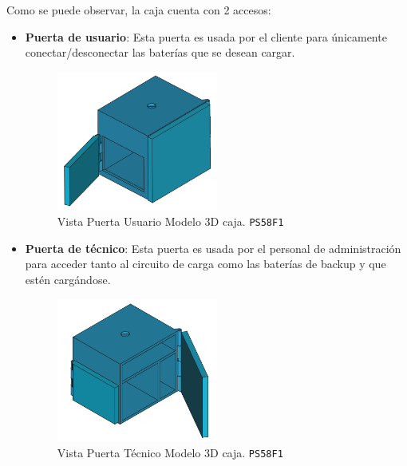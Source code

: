 Como se puede observar, la caja cuenta con 2 accesos:
\begin{itemize}
    \item \textbf{Puerta de usuario}: Esta puerta es usada por el cliente para únicamente conectar/desconectar las baterías que se desean cargar.

\begin{figure}[H]
    \centering
    \includegraphics[width=0.5\textwidth]{images/4-DesarrolloTeorico/4-1-caja/CAJA_3D_PUERTA_USER.png}
    \caption{Vista Puerta Usuario Modelo 3D caja. \texttt{PS58F1}}
    \label{fig:DesarrolloTeorico/Caja/CAJA_3D_PUERTA_USER}
\end{figure}

    \item \textbf{Puerta de técnico}: Esta puerta es usada por el personal de administración para acceder tanto al circuito de carga como las baterías de backup y que estén cargándose.
\begin{figure}[H]
    \centering
    \includegraphics[width=0.5\textwidth]{images/4-DesarrolloTeorico/4-1-caja/CAJA_3D_PUERTA_ADMIN.png}
    \caption{Vista Puerta Técnico Modelo 3D caja. \texttt{PS58F1}}
    \label{fig:DesarrolloTeorico/Caja/CAJA_3D_PUERTA_ADMIN}
\end{figure}

\end{itemize}

